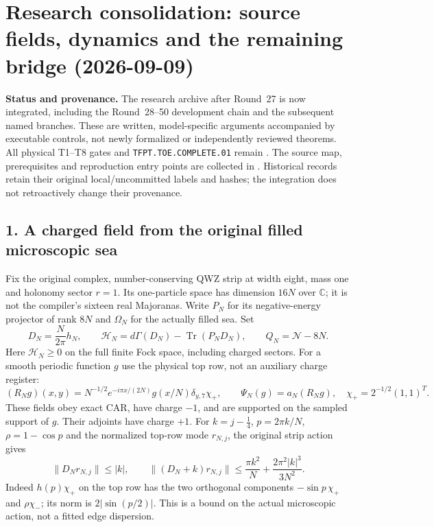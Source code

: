 \section*{Research consolidation: source fields, dynamics and the remaining bridge (2026-09-09)}
\label{sec:research-20260909}
\noindent\textbf{Status and provenance.}
The research archive after Round~27 is now integrated, including the
Round~28--50 development chain and the subsequent named branches.
These are written, model-specific arguments accompanied by executable
controls, not newly formalized or independently reviewed theorems.
All physical T1--T8 gates and \texttt{TFPT.TOE.COMPLETE.01} remain \mO.
The source map, prerequisites and reproduction entry points are collected in
.
Historical records retain their original local/uncommitted labels and
hashes; the integration does not retroactively change their provenance.

\subsection*{1. A charged field from the original filled microscopic sea}
Fix the original complex, number-conserving QWZ strip at width eight,
mass one and holonomy sector $r=1$. Its one-particle space has dimension
$16N$ over $\mathbb C$; it is not the compiler's sixteen real Majoranas.
Write $P_N$ for its negative-energy projector of rank $8N$ and
$\Omega_N$ for the actually filled sea. Set
\[
 D_N=\frac{N}{2\pi}h_N,\qquad
 \mathcal H_N=d\Gamma(D_N)-\operatorname{Tr}(P_ND_N),\qquad
 Q_N=\mathcal N-8N.
\]
Here $\mathcal H_N\geq0$ on the full finite Fock space, including charged
sectors. For a smooth periodic function $g$ use the physical top row,
not an auxiliary charge register:
\[
 (R_Ng)(x,y)=N^{-1/2}e^{-i\pi x/(2N)}g(x/N)
       \delta_{y,7}\chi_+,\qquad \Psi_N(g)=a_N(R_Ng),
 \quad \chi_+=2^{-1/2}(1,1)^T.
\]
These fields obey exact CAR, have charge $-1$, and are supported on the
sampled support of $g$. Their adjoints have charge $+1$.
For $k=j-\tfrac14$, $p=2\pi k/N$, $\rho=1-\cos p$ and the normalized
top-row mode $r_{N,j}$, the original strip action gives
\[
 \|D_Nr_{N,j}\|\leq |k|,\qquad
 \|(D_N+k)r_{N,j}\|
 \leq\frac{\pi k^2}{N}+\frac{2\pi^2|k|^3}{3N^2}.
\]
Indeed $h(p)\chi_+$ on the top row has the two orthogonal components
$-\sin p\,\chi_+$ and $\rho\chi_-$; its norm is
$2|\sin(p/2)|$. This is a bound on the actual microscopic action,
not a fitted edge dispersion.

